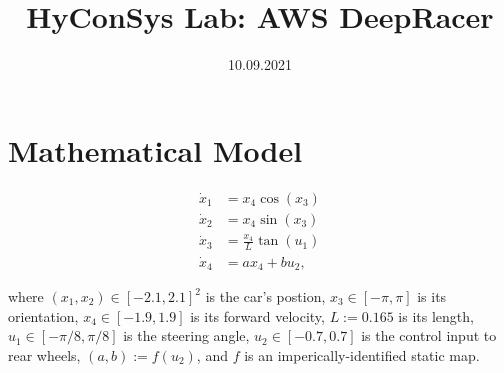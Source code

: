 \documentclass[12pt]{article}
\title{
  HyConSys Lab: AWS DeepRacer
  \vspace{-1.4cm}
}
\date{10.09.2021}
\begin{document}
\maketitle

\section{Mathematical Model}

\begin{equation} \label{eq1}
\begin{split}
\dot x_1 &= x_4 \cos(x_3) \\
\dot x_2 &= x_4 \sin(x_3) \\
\dot x_3 &= \frac{x_4}{L} \tan(u_1)\\
\dot x_4 &= a x_4 + b u_2,
\end{split}
\end{equation}

where 
$(x_1,x_2) \in [-2.1,2.1]^2$ is the car's postion, 
$x_3 \in [-\pi,\pi]$ is its orientation,
$x_4 \in [-1.9,1.9]$ is its forward velocity,
$L := 0.165$  is its length, 
$u_1 \in [-\pi/8,\pi/8]$ is the steering angle,
$u_2 \in [-0.7,0.7]$ is the control input to rear wheels,
$(a,b) := f(u_2)$, and 
$f$ is an imperically-identified static map.
\end{document}
